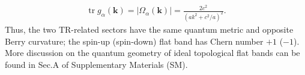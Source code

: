 \documentclass[prl,twocolumn,superscriptaddress,float,aps]{revtex4-2}
\newcommand{\kk}{\mathbf{k}}
\newcommand{\tr}{\operatorname{tr}}
\newcommand{\Berry}{\Omega}
\newcommand{\metric}{g}
\begin{document}
\begin{align}
	\tr\metric_{\alpha}(\kk) = |\Berry_{\alpha}(\kk)|
	= \frac{2c^{2}}{(a k^{2} + c^{2}/a)^{2}}.
	\label{eq:geometry-results}
\end{align}
Thus, the two TR-related sectors have the same quantum metric and opposite Berry curvature; the spin-up (spin-down) flat band has Chern number $+1$ ($-1$).
More discussion on the quantum geometry of ideal topological flat bands can be found in Sec.A of Supplementary Materials (SM). 



\end{document}
